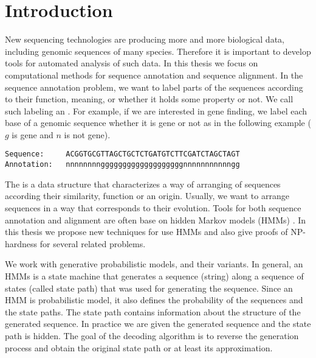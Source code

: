 \chapter{Introduction}

New sequencing technologies are producing more and more biological data,
including genomic sequences of many species. Therefore it is important to
develop tools for automated analysis of such data. In this thesis we focus on
computational methods for sequence annotation and sequence alignment.  In the
sequence annotation problem, we want to label parts of the sequences according
to their function, meaning, or whether it holds some property or not. We call
such labeling an . For example, if we are interested in
gene finding, we label each base of a genomic sequence whether it is
gene or not as in the following example ($g$ is gene and $n$ is not gene).
\begin{verbatim}
Sequence:     ACGGTGCGTTAGCTGCTCTGATGTCTTCGATCTAGCTAGT 
Annotation:   nnnnnnnngggggggggggggggggggnnnnnnnnnnngg
\end{verbatim}
The  is a data structure
that characterizes a way of arranging of sequences according their
similarity, function or an origin.  Usually, we want to arrange sequences in
a way that corresponds to their evolution.  Tools for both
sequence annotation and alignment are often base on hidden Markov models (HMMs)
\cite{Durbin1998,Alexanderson2004,Brejova2005, FEAST2011,Krogh2001,Majoros2005,
Meyer2002,Nanasi2010,Pairagon2009, Schultz2006,Kovac2012,Pachter2002,
Liu2010,Brown2010, Lunter2008}.  In this thesis we propose new techniques for
use HMMs and also give proofs of NP-hardness for several related problems.

We work with generative probabilistic models,  and their variants. In general, an HMMs is a state machine that
generates a sequence (string) along a sequence of states (called state path)
that was used for generating the sequence. Since an HMM is probabilistic model,
it also defines the probability of the sequences and the state paths. The state
path contains information about the structure of the generated sequence. In
practice we are given the generated sequence and the state path is hidden. The
goal of the decoding algorithm is to reverse the generation process and obtain
the original state path or at least its approximation.

